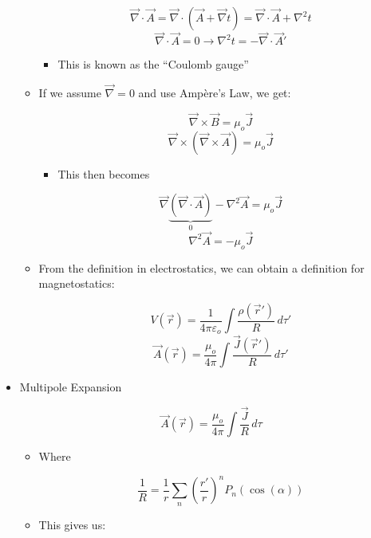 \begin{itemize}
\begin{itemize}
\begin{itemize}
        \end{itemize}

        $$\vec{\nabla}\cdot\vec{A}=\vec{\nabla}\cdot(\vec{A}+\vec{\nabla}t)=\vec{\nabla}\cdot\vec{A}+\nabla^2t$$
        $$\vec{\nabla}\cdot\vec{A}=0\to \nabla^2t=-\vec{\nabla}\cdot\vec{A}\prime$$

        \begin{itemize}

          \item This is known as the ``Coulomb gauge''

        \end{itemize}

      \item If we assume $\vec{\nabla}=0$ and use Amp\`ere's Law, we get:

        $$\vec{\nabla}\times\vec{B}=\mu_o\vec{J}$$
        $$\vec{\nabla}\times(\vec{\nabla}\times\vec{A})=\mu_o\vec{J}$$

        \begin{itemize}

          \item This then becomes

        \end{itemize}

        $$\vec{\nabla}\underbrace{(\vec{\nabla}\cdot\vec{A})}_{0}-\nabla^2\vec{A}=\mu_o\vec{J}$$
        $$\nabla^2\vec{A}=-\mu_o\vec{J}$$

      \item From the definition in electrostatics, we can obtain a definition for magnetostatics:

        $$V(\vec{r})=\frac{1}{4\pi\varepsilon_o}\int\frac{\rho(\vec{r}\prime)}{R}\,d\tau'$$
        $$\vec{A}(\vec{r})=\frac{\mu_o}{4\pi}\int\frac{\vec{J}(\vec{r}\prime)}{R}\,d\tau'$$

    \end{itemize}

  \item Multipole Expansion

    $$\vec{A}(\vec{r})=\frac{\mu_o}{4\pi}\int\frac{\vec{J}}{R}\,d\tau$$

    \begin{itemize}

      \item Where

        $$\frac{1}{R}=\frac{1}{r}\sum_n\left( \frac{r'}{r} \right)^nP_n(\cos(\alpha))$$

      \item This gives us:


\end{itemize}
\end{itemize}
